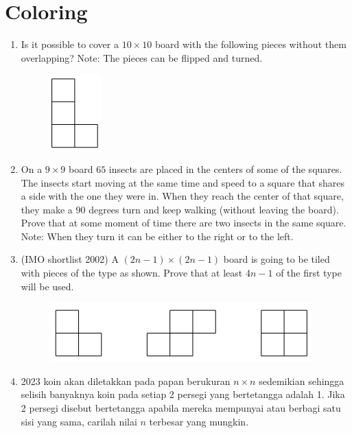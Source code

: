 \documentclass[11pt]{scrartcl}
\begin{document}
\section{Coloring}
\begin{enumerate}[resume]
\item Is it possible to cover a $10 \times 10$ board with the following pieces without them overlapping? Note: The pieces can be flipped and turned.
\begin{figure}[h]
    \centering
    \includegraphics{Kombin/Game-Invariant/tetromino-L.png}
\end{figure}

\item On a $9 \times 9$ board $65$ insects are placed in the centers of some of the squares. The insects start moving at the same time and speed to a square that shares a side with the one they were in. When they reach the center of that square, they make a $90$ degrees turn and keep walking (without leaving the board). Prove that at some moment of time there are two insects in the same square. Note: When they turn it can be either to the right or to the left.

\item (IMO shortlist 2002) A $(2n - 1) \times (2n - 1)$ board is going to be tiled with pieces of the type as shown. Prove that at least $4n - 1$ of the first type will be used.
\begin{figure}[h]
    \centering
    \includegraphics{Kombin/Game-Invariant/IMOSL2002Domino.png}
\end{figure}

\item
    2023 koin akan diletakkan pada papan berukuran $n \times n$ sedemikian sehingga selisih banyaknya koin pada setiap 2 persegi yang bertetangga adalah 1. Jika 2 persegi disebut bertetangga apabila mereka mempunyai atau berbagi satu sisi yang sama, carilah nilai $n$ terbesar yang mungkin.



\end{enumerate}
\end{document}
